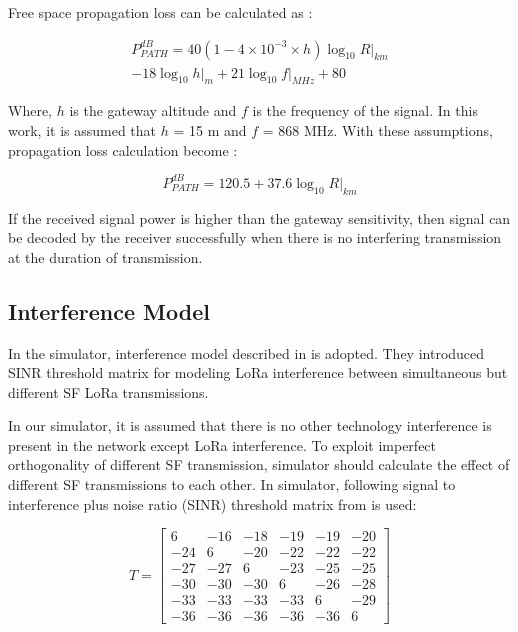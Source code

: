 \documentclass[conference]{IEEEtran}
\begin{document}
\par Free space propagation loss can be calculated as \cite{TR136.942}:

\begin{equation} \label{eq:propagation_loss}
\begin{split}
P^{dB}_{PATH} = 40(1 - 4 \times 10^{-3} \times h){\log_{10} R|_{km}} \\
- 18 {\log_{10} h|_{m}} + 21 {\log_{10} f|_{MHz}} + 80
\end{split}
\end{equation}

\par Where, $h$ is the gateway altitude and $f$ is the frequency of the signal. In this work, it is assumed that $h$ = 15 m and $f$ = 868 MHz. With these assumptions, propagation loss calculation become \cite{7996384}:

\begin{equation} \label{eq:propagation_loss_simplified}
P^{dB}_{PATH} = 120.5 + 37.6 {\log_{10} R|_{km}}
\end{equation}

\par If the received signal power is higher than the gateway sensitivity, then signal can be decoded by the receiver successfully when there is no interfering transmission at the duration of transmission.

\subsection{Interference Model}
\par In the simulator, interference model described in \cite{7996384} is adopted. They introduced SINR threshold matrix for modeling LoRa interference between simultaneous but different SF LoRa transmissions.

\par In our simulator, it is assumed that there is no other technology interference is present in the network except LoRa interference. To exploit imperfect orthogonality of different SF transmission, simulator should calculate the effect of different SF transmissions to each other. In simulator, following signal to interference plus noise ratio (SINR) threshold matrix from \cite{goursaud:hal-01231221} is used:

\begin{equation} \label{eq:sinr}
T = \begin{bmatrix}
       6 & -16 & -18 & -19 & -19 & -20 \\
     -24 &   6 & -20 & -22 & -22 & -22 \\
     -27 & -27 &   6 & -23 & -25 & -25 \\
     -30 & -30 & -30 &   6 & -26 & -28 \\
     -33 & -33 & -33 & -33 &   6 & -29 \\
     -36 & -36 & -36 & -36 & -36 &   6
     \end{bmatrix}
\end{equation}
\end{document}
